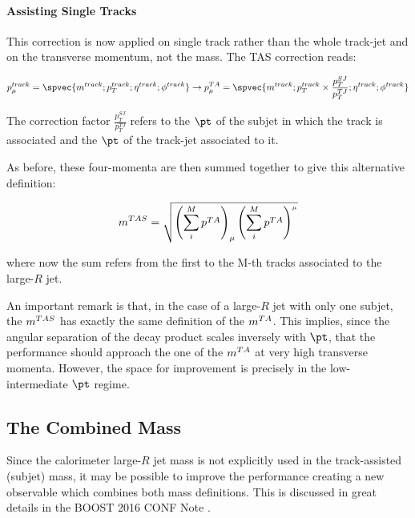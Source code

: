 \paragraph{Assisting Single Tracks}
\label{sec:tas}

This correction is now applied on single track rather than the whole track-jet and on the transverse momentum, not the mass.
The TAS correction reads:

$$p_\mu^{track} = \spvec{m^{track};p_T^{track};\eta^{track};\phi^{track}} \to p_\mu^{TA}=\spvec{m^{track} ;p_T^{track} \times\frac{p_T^{SJ}}{p_T^{TJ}};\eta^{track};\phi^{track}}$$

The correction factor $\frac{p_T^{SJ}}{p_T^{TJ}}$ refers to the $\pt$ of the subjet in which the track is associated and the $\pt$ of the track-jet associated to it.


As before, these four-momenta are then summed together to give this alternative definition:

$$ m^{TAS}=\sqrt{\left(\sum_i^M p^{TA} \right)_\mu \left(\sum_i^M p^{TA} \right)^{_\mu}} $$

where now the sum refers from the first to the M-th tracks associated to the large-$R$ jet.


An important remark is that, in the case of a large-$R$ jet with only one subjet, the $m^{TAS}$ has exactly the same definition of the $m^{TA}$. This implies, since the angular separation of the decay product scales inversely with $\pt$, that the performance should approach the one of the $m^{TA}$ at very high transverse momenta. However, the space for improvement is precisely in the low-intermediate $\pt$ regime.


\subsection{The Combined Mass}
\label{subsec:comb}


Since the calorimeter large-$R$ jet mass is not explicitly used in the track-assisted (subjet) mass, it may be possible to improve the performance creating a new observable which combines both mass definitions.
This is discussed in great details in the BOOST 2016 CONF Note \cite{art35}.




